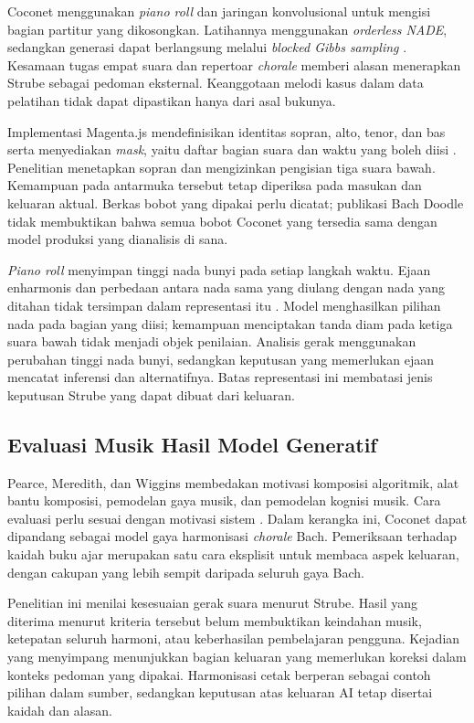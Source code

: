 Coconet menggunakan \textit{piano roll} dan jaringan konvolusional untuk mengisi bagian partitur yang dikosongkan. Latihannya menggunakan \textit{orderless NADE}, sedangkan generasi dapat berlangsung melalui \textit{blocked Gibbs sampling} \parencite[211--215]{huang2017}. Kesamaan tugas empat suara dan repertoar \textit{chorale} memberi alasan menerapkan Strube sebagai pedoman eksternal. Keanggotaan melodi kasus dalam data pelatihan tidak dapat dipastikan hanya dari asal bukunya.

Implementasi Magenta.js mendefinisikan identitas sopran, alto, tenor, dan bas serta menyediakan \textit{mask}, yaitu daftar bagian suara dan waktu yang boleh diisi \parencite{magentacoconet}. Penelitian menetapkan sopran dan mengizinkan pengisian tiga suara bawah. Kemampuan pada antarmuka tersebut tetap diperiksa pada masukan dan keluaran aktual. Berkas bobot yang dipakai perlu dicatat; publikasi Bach Doodle tidak membuktikan bahwa semua bobot Coconet yang tersedia sama dengan model produksi yang dianalisis di sana.

\textit{Piano roll} menyimpan tinggi nada bunyi pada setiap langkah waktu. Ejaan enharmonis dan perbedaan antara nada sama yang diulang dengan nada yang ditahan tidak tersimpan dalam representasi itu \parencite{magentacoconet}. Model menghasilkan pilihan nada pada bagian yang diisi; kemampuan menciptakan tanda diam pada ketiga suara bawah tidak menjadi objek penilaian. Analisis gerak menggunakan perubahan tinggi nada bunyi, sedangkan keputusan yang memerlukan ejaan mencatat inferensi dan alternatifnya. Batas representasi ini membatasi jenis keputusan Strube yang dapat dibuat dari keluaran.

\subsection{Evaluasi Musik Hasil Model Generatif}\label{sec:teori-evaluasi}

Pearce, Meredith, dan Wiggins membedakan motivasi komposisi algoritmik, alat bantu komposisi, pemodelan gaya musik, dan pemodelan kognisi musik. Cara evaluasi perlu sesuai dengan motivasi sistem \parencite{pearce2002}. Dalam kerangka ini, Coconet dapat dipandang sebagai model gaya harmonisasi \textit{chorale} Bach. Pemeriksaan terhadap kaidah buku ajar merupakan satu cara eksplisit untuk membaca aspek keluaran, dengan cakupan yang lebih sempit daripada seluruh gaya Bach.

Penelitian ini menilai kesesuaian gerak suara menurut Strube. Hasil yang diterima menurut kriteria tersebut belum membuktikan keindahan musik, ketepatan seluruh harmoni, atau keberhasilan pembelajaran pengguna. Kejadian yang menyimpang menunjukkan bagian keluaran yang memerlukan koreksi dalam konteks pedoman yang dipakai. Harmonisasi cetak berperan sebagai contoh pilihan dalam sumber, sedangkan keputusan atas keluaran AI tetap disertai kaidah dan alasan.

